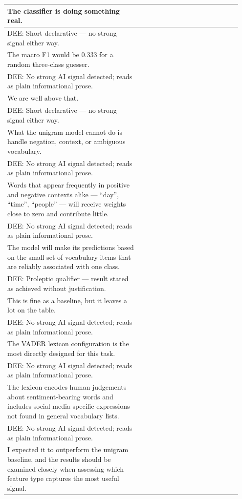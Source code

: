 \documentclass[11pt]{article}
\begin{document}
\begin{longtable}{|p{0.55\linewidth}|p{0.40\linewidth}|}
\hline
The classifier is doing something real. & \\[2pt]
\hline
DEE: Short declarative --- no strong signal either way. & \\
\hline
The macro F1 would be 0.333 for a random three-class guesser. & \\[2pt]
\hline
DEE: No strong AI signal detected; reads as plain informational prose. & \\
\hline
We are well above that. & \\[2pt]
\hline
DEE: Short declarative --- no strong signal either way. & \\
\hline
What the unigram model cannot do is handle negation, context, or ambiguous vocabulary. & \\[2pt]
\hline
DEE: No strong AI signal detected; reads as plain informational prose. & \\
\hline
Words that appear frequently in positive and negative contexts alike --- ``day'', ``time'', ``people'' --- will receive weights close to zero and contribute little. & \\[2pt]
\hline
DEE: No strong AI signal detected; reads as plain informational prose. & \\
\hline
The model will make its predictions based on the small set of vocabulary items that are reliably associated with one class. & \\[2pt]
\hline
DEE: Proleptic qualifier --- result stated as achieved without justification. & \\
\hline
This is fine as a baseline, but it leaves a lot on the table. & \\[2pt]
\hline
DEE: No strong AI signal detected; reads as plain informational prose. & \\
\hline
The VADER lexicon configuration is the most directly designed for this task. & \\[2pt]
\hline
DEE: No strong AI signal detected; reads as plain informational prose. & \\
\hline
The lexicon encodes human judgements about sentiment-bearing words and includes social media specific expressions not found in general vocabulary lists. & \\[2pt]
\hline
DEE: No strong AI signal detected; reads as plain informational prose. & \\
\hline
I expected it to outperform the unigram baseline, and the results should be examined closely when assessing which feature type captures the most useful signal. & \\[2pt]

\end{longtable}
\end{document}
